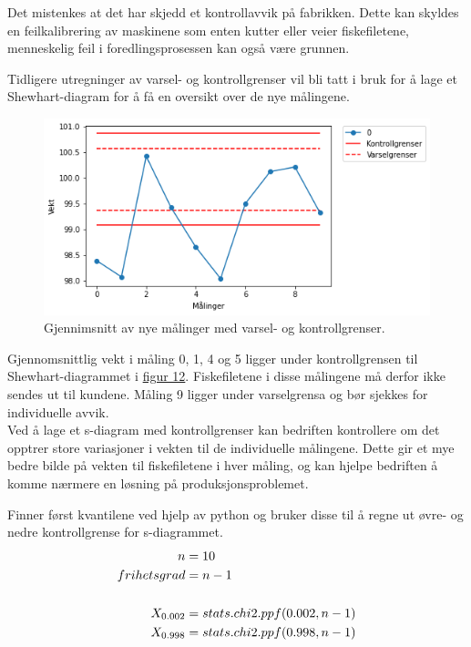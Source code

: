 \documentclass[12pt]{article}
\begin{document}
Det mistenkes at det har skjedd et kontrollavvik på fabrikken. Dette kan skyldes en feilkalibrering av maskinene som enten kutter eller veier fiskefiletene, menneskelig feil i foredlingsprosessen kan også være grunnen. 

Tidligere utregninger av varsel- og kontrollgrenser vil bli tatt i bruk for å lage et Shewhart-diagram for å få en oversikt over de nye målingene.

\begin{figure}[H]
    \centering
    \includegraphics[scale = 0.85]{average.png}
    \caption{Gjennimsnitt av nye målinger med varsel- og kontrollgrenser.\cite{1}}
    \label{fig:fig12}
\end{figure}


Gjennomsnittlig vekt i måling 0, 1, 4 og 5 ligger under kontrollgrensen til Shewhart-diagrammet i \hyperref[fig:fig12]{figur 12}.
Fiskefiletene i disse målingene må derfor ikke sendes ut til kundene.
Måling 9 ligger under varselgrensa og bør sjekkes for individuelle avvik.\\


Ved å lage et s-diagram med kontrollgrenser kan bedriften kontrollere om det opptrer store variasjoner i vekten til de individuelle målingene. Dette gir et mye bedre bilde på vekten til fiskefiletene i hver måling, og kan hjelpe bedriften å komme nærmere en løsning på produksjonsproblemet.

Finner først kvantilene ved hjelp av python og bruker disse til å regne ut øvre- og nedre kontrollgrense for s-diagrammet.
\begin{equation}
    \centering
    \begin{aligned}
    n & = 10\\
    frihetsgrad & = n-1\\\\
     X_{0.002} & = stats.chi2.ppf(0.002, n-1)\\
     X_{0.998} & = stats.chi2.ppf(0.998, n-1)
    \end{aligned}
\end{equation}
\end{document}
